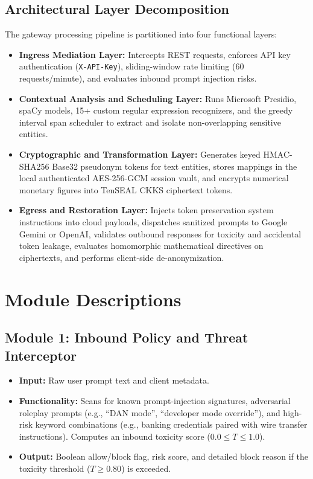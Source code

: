 \documentclass[12pt,a4paper,oneside]{report}
\numberwithin{equation}{chapter}
\begin{document}
\subsection{Architectural Layer Decomposition}
The gateway processing pipeline is partitioned into four functional layers:
\begin{itemize}[leftmargin=*]
    \item \textbf{Ingress Mediation Layer:} Intercepts REST requests, enforces API key authentication (\texttt{X-API-Key}), sliding-window rate limiting (60 requests/minute), and evaluates inbound prompt injection risks.
    \item \textbf{Contextual Analysis and Scheduling Layer:} Runs Microsoft Presidio, spaCy models, 15+ custom regular expression recognizers, and the greedy interval span scheduler to extract and isolate non-overlapping sensitive entities.
    \item \textbf{Cryptographic and Transformation Layer:} Generates keyed HMAC-SHA256 Base32 pseudonym tokens for text entities, stores mappings in the local authenticated AES-256-GCM session vault, and encrypts numerical monetary figures into TenSEAL CKKS ciphertext tokens.
    \item \textbf{Egress and Restoration Layer:} Injects token preservation system instructions into cloud payloads, dispatches sanitized prompts to Google Gemini or OpenAI, validates outbound responses for toxicity and accidental token leakage, evaluates homomorphic mathematical directives on ciphertexts, and performs client-side de-anonymization.
\end{itemize}

\section{Module Descriptions}

\subsection{Module 1: Inbound Policy and Threat Interceptor}
\begin{itemize}[leftmargin=*]
    \item \textbf{Input:} Raw user prompt text and client metadata.
    \item \textbf{Functionality:} Scans for known prompt-injection signatures, adversarial roleplay prompts (e.g., ``DAN mode'', ``developer mode override''), and high-risk keyword combinations (e.g., banking credentials paired with wire transfer instructions). Computes an inbound toxicity score ($0.0 \le T \le 1.0$).
    \item \textbf{Output:} Boolean allow/block flag, risk score, and detailed block reason if the toxicity threshold ($T \ge 0.80$) is exceeded.
\end{itemize}
\end{document}
